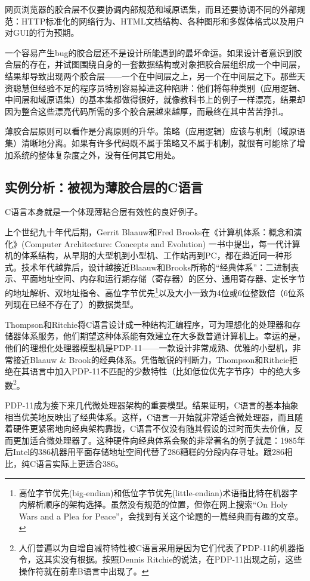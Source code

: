 \documentclass[12pt,oneside]{book}
\begin{document}
网页浏览器的胶合层不仅要协调内部规范和域原语集，而且还要协调不同的外部规范：HTTP标准化的网络行为、HTML文档结构、各种图形和多媒体格式以及用户对GUI的行为预期。

一个容易产生bug的胶合层还不是设计所能遇到的最坏命运。如果设计者意识到胶合层的存在，并试图围绕自身的一套数据结构或对象把胶合层组织成一个中间层，结果却导致出现两个胶合层——一个在中间层之上，另一个在中间层之下。那些天资聪慧但经验不足的程序员特别容易掉进这种陷阱：他们将每种类别（应用逻辑、中间层和域原语集）的基本集都做得很好，就像教科书上的例子一样漂亮，结果却因为整合这些漂亮代码所需的多个胶合层越来越厚，而最终在其中苦苦挣扎。

薄胶合层原则可以看作是分离原则的升华。策略（应用逻辑）应该与机制（域原语集）清晰地分离。如果有许多代码既不属于策略又不属于机制，就很有可能除了增加系统的整体复杂度之外，没有任何其它用处。


\subsection{实例分析：被视为薄胶合层的C语言}
C语言本身就是一个体现薄粘合层有效性的良好例子。

上个世纪九十年代后期，Gerrit Blaauw和Fred Brooks在《计算机体系：概念和演化》(Computer Architecture:  Concepts and Evolution)  \cite{BlaauwBrooks}一书中提出，每一代计算机的体系结构，从早期的大型机到小型机、工作站再到PC，都在趋近同一种形式。技术年代越靠后，设计越接近Blaauw和Brooks所称的“经典体系”：二进制表示、平面地址空间、内存和运行期存储（寄存器）的区分、通用寄存器、定长字节的地址解析、双地址指令、高位字节优先\footnote{高位字节优先(big-endian)和低位字节优先(little-endian)术语指比特在机器字内解析顺序的架构选择。虽然没有规范的位置，但你在网上搜索“On Holy Wars and a Plea for Peace”，会找到有关这个论题的一篇经典而有趣的文章。}以及大小一致为4位或6位整数倍（6位系列现在已经不存在了）的数据类型。

Thompson和Ritchie将C语言设计成一种结构汇编程序，可为理想化的处理器和存储器体系服务，他们期望这种体系能有效建立在大多数普通计算机上。幸运的是，他们的理想化处理器模型机是PDP-11——一款设计非常成熟、优雅的小型机，非常接近Blaauw \& Brook的经典体系。凭借敏锐的判断力，Thompson和Rithcie拒绝在其语言中加入PDP-11不匹配的少数特性（比如低位优先字节序）中的绝大多数\footnote{人们普遍以为自增自减符特性被C语言采用是因为它们代表了PDP-11的机器指令，这其实没有根据。按照Dennis Ritchie的说法，在PDP-11出现之前，这些操作符就在前辈B语言中出现了。}。

PDP-11成为接下来几代微处理器架构的重要模型。结果证明，C语言的基本抽象相当优美地反映出了经典体系。这样，C语言一开始就非常适合微处理器，而且随着硬件更紧密地向经典架构靠拢，C语言不仅没有随其假设的过时而失去价值，反而更加适合微处理器了。这种硬件向经典体系会聚的非常著名的例子就是：1985年后Intel的386机器用平面存储地址空间代替了286糟糕的分段内存寻址。跟286相比，纯C语言实际上更适合386。
\end{document}
